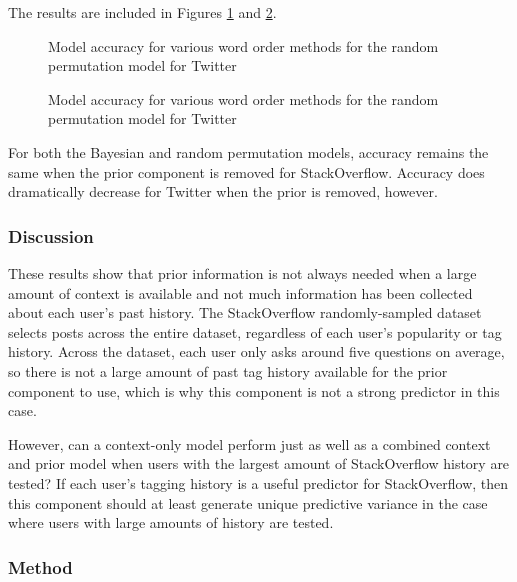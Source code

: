 \documentclass[man,floatsintext,donotrepeattitle]{apa6}
\begin{document}
The results are included in Figures \ref{figContextPriorneededSO} and \ref{figContextPriorneededT}.

\begin{figure}[!htbp]
  \caption{Model accuracy for various word order methods for the random permutation model for Twitter}
  \label{figContextPriorneededSO}
\end{figure}

\begin{figure}[!htbp]
  \caption{Model accuracy for various word order methods for the random permutation model for Twitter}
  \label{figContextPriorneededT}
\end{figure}

For both the Bayesian and random permutation models, accuracy remains the same when the prior component is removed for StackOverflow.
Accuracy does dramatically decrease for Twitter when the prior is removed, however.

\subsubsection{Discussion}

These results show that prior information is not always needed when a large amount of context is available and not much information has been collected about each user's past history.
The StackOverflow randomly-sampled dataset selects posts across the entire dataset, regardless of each user's popularity or tag history.
Across the dataset, each user only asks around five questions on average, so there is not a large amount of past tag history available for the prior component to use,
which is why this component is not a strong predictor in this case.

However, can a context-only model perform just as well as a combined context and prior model when users with the largest amount of StackOverflow history are tested?
If each user's tagging history is a useful predictor for StackOverflow,
then this component should at least generate unique predictive variance in the case where users with large amounts of history are tested.

\subsubsection{Method}
\end{document}
